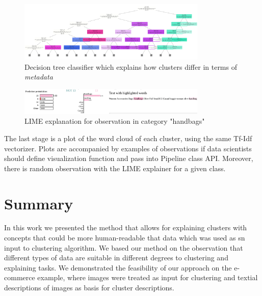 \documentclass[
 twocolumn,
 hf,
]{ceurart}
\begin{document}
\begin{figure}[h!]
  \centering
  \includegraphics[width=0.8\textwidth]{example1-clustering-products-fashion-tex/output_61_2}
  \caption{Decision tree classifier which explains how clusters differ in terms of \textit{metadata}}
  \label{fig:decision_tree}
\end{figure}

\begin{figure}[h!]
  \centering
  \includegraphics[width=0.8\textwidth]{example1-clustering-products-fashion-tex/LIME_13_handbags-Selection_265}
  \caption{LIME explanation for observation in category "handbags"}
  \label{fig:lime}
\end{figure}

The last stage is a plot of the word cloud of each cluster, using the same Tf-Idf vectorizer.
Plots are accompanied by examples of observations if data scientists should define visualization function and pass into Pipeline class API\@.
Moreover, there is random observation with the LIME explainer for a given class.

%


\section{Summary}
\label{sec:summary}
In this work we presented the method that allows for explaining clusters with concepts that could be more human-readable that data which was used as sn input to clustering algorithm.
We based our method on the observation that different types of data are suitable in different degrees to clustering and explaining tasks.
We demonstrated the feasibility of our approach on the e-commerce example, where images were treated as input for clustering and textial descriptions of images as basis for cluster descriptions.
\end{document}
